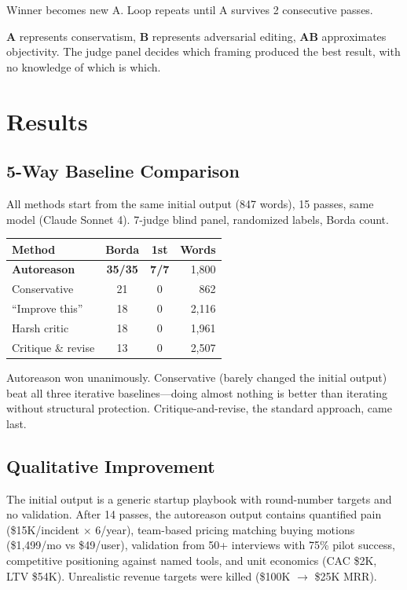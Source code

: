 \documentclass[10pt,twocolumn]{article}
\begin{document}
Winner becomes new A. Loop repeats until A survives 2 consecutive passes.

\textbf{A} represents conservatism, \textbf{B} represents adversarial editing, \textbf{AB} approximates objectivity. The judge panel decides which framing produced the best result, with no knowledge of which is which.

\section{Results}

\subsection{5-Way Baseline Comparison}

All methods start from the same initial output (847 words), 15 passes, same model (Claude Sonnet 4). 7-judge blind panel, randomized labels, Borda count.

\begin{table}[h]
\centering
\small
\begin{tabular}{@{}lccr@{}}
\toprule
\textbf{Method} & \textbf{Borda} & \textbf{1st} & \textbf{Words} \\
\midrule
\textbf{Autoreason} & \textbf{35/35} & \textbf{7/7} & 1,800 \\
Conservative & 21 & 0 & 862 \\
``Improve this'' & 18 & 0 & 2,116 \\
Harsh critic & 18 & 0 & 1,961 \\
Critique \& revise & 13 & 0 & 2,507 \\
\bottomrule
\end{tabular}
\end{table}

Autoreason won unanimously. Conservative (barely changed the initial output) beat all three iterative baselines---doing almost nothing is better than iterating without structural protection. Critique-and-revise, the standard approach, came last.

\subsection{Qualitative Improvement}

The initial output is a generic startup playbook with round-number targets and no validation. After 14 passes, the autoreason output contains quantified pain (\$15K/incident $\times$ 6/year), team-based pricing matching buying motions (\$1,499/mo vs \$49/user), validation from 50+ interviews with 75\% pilot success, competitive positioning against named tools, and unit economics (CAC \$2K, LTV \$54K). Unrealistic revenue targets were killed (\$100K $\to$ \$25K MRR).
\end{document}
